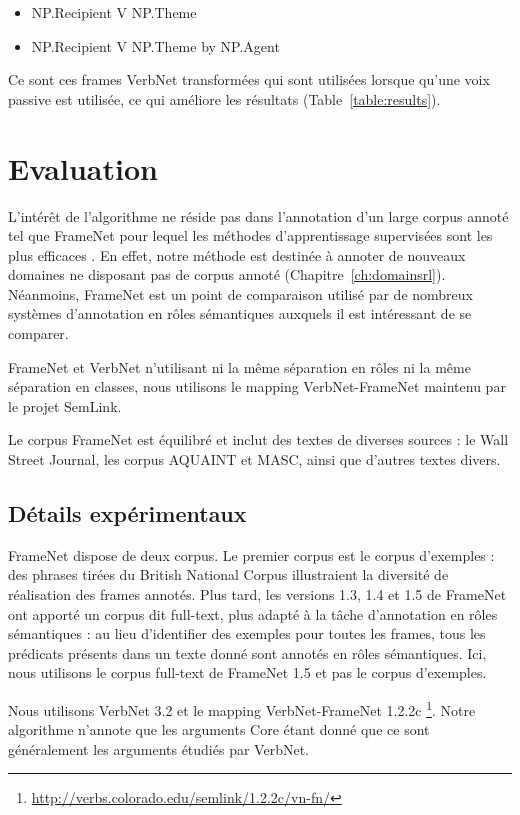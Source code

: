 \begin{itemize}
    \item NP.Recipient V NP.Theme
    \item NP.Recipient V NP.Theme by NP.Agent
\end{itemize}

Ce sont ces frames VerbNet transformées qui sont utilisées lorsque qu'une voix
passive est utilisée, ce qui améliore les résultats (Table~\ref{table:results}).

\section{Evaluation}
\label{srl:evaluation}

L'intérêt de l'algorithme ne réside pas dans l'annotation d'un large corpus
annoté tel que FrameNet pour lequel les méthodes d'apprentissage supervisées
sont les plus efficaces \citep{das2014frame}. En effet, notre méthode est
destinée à annoter de nouveaux domaines ne disposant pas de corpus annoté
(Chapitre~\ref{ch:domainsrl}). Néanmoins, FrameNet est un point de comparaison
utilisé par de nombreux systèmes d'annotation en rôles sémantiques auxquels il
est intéressant de se comparer.

FrameNet et VerbNet n'utilisant ni la même séparation en rôles ni la même
séparation en classes, nous utilisons le mapping VerbNet-FrameNet maintenu par
le projet SemLink.

Le corpus FrameNet est équilibré et inclut des textes de diverses sources : le
Wall Street Journal, les corpus AQUAINT et MASC, ainsi que d'autres textes
divers.

\subsection{Détails expérimentaux}
\label{subsec:corpora_tools}

FrameNet dispose de deux corpus. Le premier corpus est le corpus d'exemples :
des phrases tirées du British National Corpus illustraient la diversité de
réalisation des frames annotés. Plus tard, les versions 1.3, 1.4 et 1.5 de
FrameNet ont apporté un corpus dit full-text, plus adapté à la tâche
d'annotation en rôles sémantiques : au lieu d'identifier des exemples pour
toutes les frames, tous les prédicats présents dans un texte donné sont annotés
en rôles sémantiques. Ici, nous utilisons le corpus full-text de FrameNet 1.5
et pas le corpus d'exemples.

Nous utilisons VerbNet 3.2 et le mapping VerbNet-FrameNet 1.2.2c
\footnote{\url{http://verbs.colorado.edu/semlink/1.2.2c/vn-fn/}}. Notre
algorithme n'annote que les arguments Core étant donné que ce sont généralement
les arguments étudiés par VerbNet.


